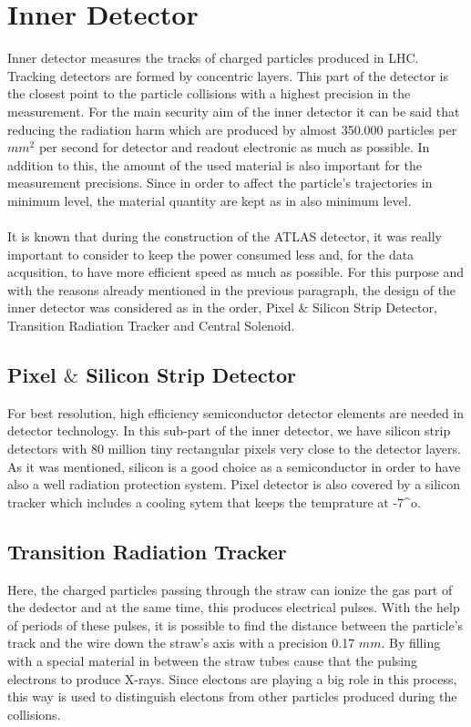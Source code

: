 \documentclass[a4paper,9pt]{article}
\begin{document}
\section{Inner Detector}
Inner detector measures the tracks of charged particles produced in LHC. Tracking detectors are formed by concentric layers. This part 
of the detector is the closest point to the particle collisions with a highest precision in the measurement. For the main security aim of the inner detector
it can be said that reducing the radiation harm which are produced by almost 350.000 particles per ${mm}^2$ per second for detector and 
readout electronic as much as possible. In addition to this, the amount of the used material is also important for the
measurement precisions. Since in order to affect the particle's trajectories in minimum level, the material quantity are kept as in
also minimum level.
\\\\
It is known that during the construction of the ATLAS detector, it was really important to consider to keep the power consumed less
and, for the data acqusition, to have more efficient speed as much as possible. For this purpose and with the reasons already
mentioned in the previous paragraph, the design of the inner detector was considered as in the order,
Pixel $\&$ Silicon Strip Detector, Transition Radiation Tracker and Central Solenoid.

\subsection{Pixel $\&$ Silicon Strip Detector}
For best resolution, high efficiency semiconductor detector elements are needed in detector technology. In this sub-part of the inner
detector, we have silicon strip detectors with 80 million tiny rectangular pixels very close to the detector layers. As it was mentioned,
silicon is a good choice as a semiconductor in order to have also a well radiation protection system. 
Pixel detector is also covered by a silicon tracker which includes a cooling sytem that keeps the temprature at -7^{o}.

\subsection{Transition Radiation Tracker}
Here, the charged particles passing through the straw can ionize the gas part of the dedector and at the same time, this produces electrical
pulses.  With the help of periods of these pulses, it is possible to find the distance between the particle's track and the wire down the 
straw's axis with a precision 0.17 $mm$. By filling with a special material in between the straw tubes cause that the pulsing electrons
to produce X-rays. Since electons are playing a big role in this process, this way is used to distinguish electons from other particles
produced during the collisions.
\end{document}
